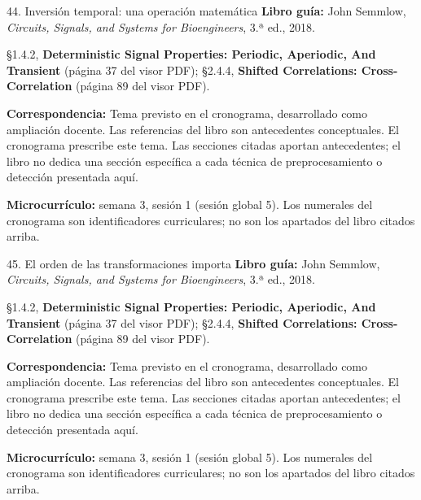 \documentclass[
  10pt,
  ignorenonframetext,
  aspectratio=169,
  spanish,
]{beamer}
\begin{document}
\begin{frame}{44. Inversión temporal: una operación matemática}
\label{inversiuxf3n-temporal-una-operaciuxf3n-matemuxe1tica}
\textbf{Libro guía:} John Semmlow, \emph{Circuits, Signals, and Systems
for Bioengineers}, 3.ª ed., 2018.

§1.4.2, \textbf{Deterministic Signal Properties: Periodic, Aperiodic,
And Transient} (página 37 del visor PDF); §2.4.4, \textbf{Shifted
Correlations: Cross-Correlation} (página 89 del visor PDF).

\textbf{Correspondencia:} Tema previsto en el cronograma, desarrollado
como ampliación docente. Las referencias del libro son antecedentes
conceptuales. El cronograma prescribe este tema. Las secciones citadas
aportan antecedentes; el libro no dedica una sección específica a cada
técnica de preprocesamiento o detección presentada aquí.

\textbf{Microcurrículo:} semana 3, sesión 1 (sesión global 5). Los
numerales del cronograma son identificadores curriculares; no son los
apartados del libro citados arriba.
\end{frame}

\begin{frame}{45. El orden de las transformaciones importa}
\label{el-orden-de-las-transformaciones-importa}
\textbf{Libro guía:} John Semmlow, \emph{Circuits, Signals, and Systems
for Bioengineers}, 3.ª ed., 2018.

§1.4.2, \textbf{Deterministic Signal Properties: Periodic, Aperiodic,
And Transient} (página 37 del visor PDF); §2.4.4, \textbf{Shifted
Correlations: Cross-Correlation} (página 89 del visor PDF).

\textbf{Correspondencia:} Tema previsto en el cronograma, desarrollado
como ampliación docente. Las referencias del libro son antecedentes
conceptuales. El cronograma prescribe este tema. Las secciones citadas
aportan antecedentes; el libro no dedica una sección específica a cada
técnica de preprocesamiento o detección presentada aquí.

\textbf{Microcurrículo:} semana 3, sesión 1 (sesión global 5). Los
numerales del cronograma son identificadores curriculares; no son los
apartados del libro citados arriba.
\end{frame}
\end{document}
